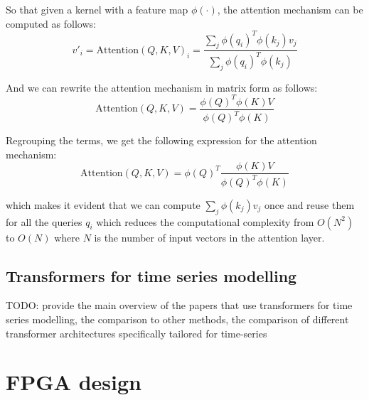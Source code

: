 \documentclass[a4paper, twoside]{report}
\theoremstyle{definition}
\numberwithin{equation}{section}
\begin{document}
So that given a kernel with a feature map $\phi(\cdot)$, the attention mechanism can be computed as follows:
\begin{equation}
    v'_i=\text{Attention}(Q, K, V)_i=\frac{\sum_j \phi(q_i)^T \phi(k_j) v_j}{\sum_j \phi(q_i)^T \phi(k_j)}
\end{equation}

And we can rewrite the attention mechanism in matrix form as follows:
\begin{equation}
    \text{Attention}(Q, K, V)=\frac{\phi(Q)^T \phi(K) V}{\phi(Q)^T \phi(K)}
\end{equation}

Regrouping the terms, we get the following expression for the attention mechanism:
\begin{equation}
    \text{Attention}(Q, K, V)=\phi(Q)^T \frac{\phi(K) V}{\phi(Q)^T \phi(K)}
\end{equation}

which makes it evident that we can compute $\sum_j \phi(k_j) v_j$ once and reuse them for all the queries $q_i$
which reduces the computational complexity from $O(N^2)$ to $O(N)$ where $N$ is the number of input vectors
in the attention layer.





\subsection{Transformers for time series modelling}

TODO: provide the main overview of the papers that use transformers for time series modelling,
the comparison to other methods, the comparison of different transformer architectures specifically
tailored for time-series


\section{FPGA design}

\end{document}

